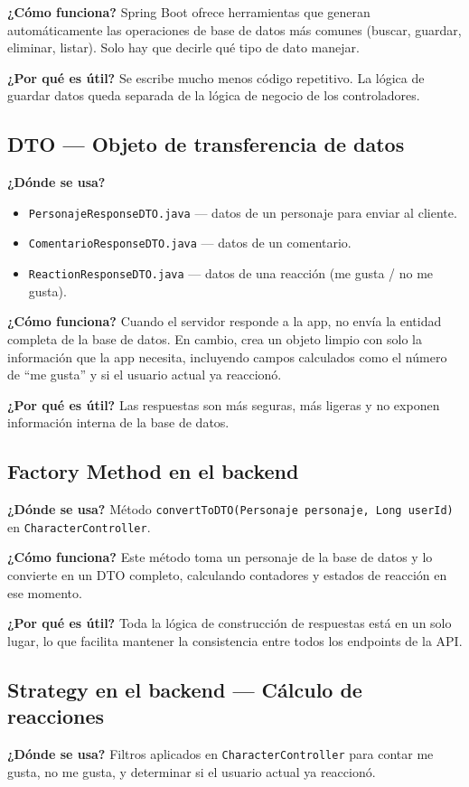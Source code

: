 \documentclass[12pt,a4paper]{article}
\begin{document}
\textbf{¿Cómo funciona?} Spring Boot ofrece herramientas que generan automáticamente las operaciones de base de datos más comunes (buscar, guardar, eliminar, listar). Solo hay que decirle qué tipo de dato manejar.

\textbf{¿Por qué es útil?} Se escribe mucho menos código repetitivo. La lógica de guardar datos queda separada de la lógica de negocio de los controladores.


\subsection{DTO — Objeto de transferencia de datos}
\textbf{¿Dónde se usa?}
\begin{itemize}[leftmargin=1.2cm]
  \item \texttt{PersonajeResponseDTO.java} — datos de un personaje para enviar al cliente.
  \item \texttt{ComentarioResponseDTO.java} — datos de un comentario.
  \item \texttt{ReactionResponseDTO.java} — datos de una reacción (me gusta / no me gusta).
\end{itemize}

\textbf{¿Cómo funciona?} Cuando el servidor responde a la app, no envía la entidad completa de la base de datos. En cambio, crea un objeto limpio con solo la información que la app necesita, incluyendo campos calculados como el número de ``me gusta'' y si el usuario actual ya reaccionó.

\textbf{¿Por qué es útil?} Las respuestas son más seguras, más ligeras y no exponen información interna de la base de datos.

\subsection{Factory Method en el backend}
\textbf{¿Dónde se usa?} Método \texttt{convertToDTO(Personaje personaje, Long userId)} en \texttt{CharacterController}.

\textbf{¿Cómo funciona?} Este método toma un personaje de la base de datos y lo convierte en un DTO completo, calculando contadores y estados de reacción en ese momento.

\textbf{¿Por qué es útil?} Toda la lógica de construcción de respuestas está en un solo lugar, lo que facilita mantener la consistencia entre todos los endpoints de la API.

\subsection{Strategy en el backend — Cálculo de reacciones}
\textbf{¿Dónde se usa?} Filtros aplicados en \texttt{CharacterController} para contar me gusta, no me gusta, y determinar si el usuario actual ya reaccionó.
\end{document}
